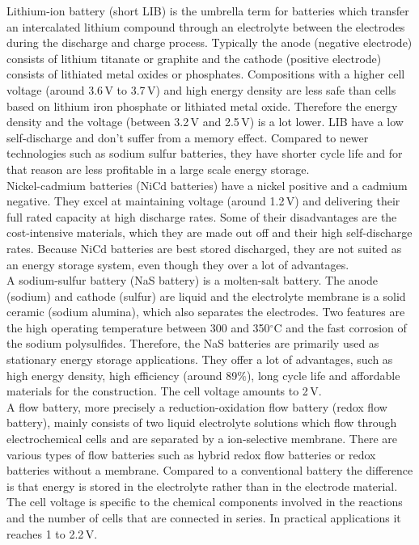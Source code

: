 \begin{parcolumns}[colwidths={1=2.5 cm, 2=10 cm, 3=2.5cm}]{3}
{Lithium-ion battery (short LIB) is the umbrella term for batteries which transfer an intercalated lithium compound through an electrolyte between the electrodes during the discharge and charge process. Typically the anode (negative electrode) consists of lithium titanate or graphite and the cathode (positive electrode) consists of lithiated metal oxides or phosphates. Compositions with a higher cell voltage (around 3.6\,V to 3.7\,V) and high energy density are less safe than cells based on lithium iron phosphate or lithiated metal oxide. Therefore the energy density and the voltage (between 3.2\,V and 2.5\,V) is a lot lower. LIB have a low self-discharge and don't suffer from a memory effect. Compared to newer technologies such as sodium sulfur batteries, they have shorter cycle life and for that reason are less profitable in a large scale energy storage.\\ Nickel-cadmium batteries (NiCd batteries) have a nickel positive and a cadmium negative. They excel at maintaining voltage (around 1.2\,V)  and delivering their full rated capacity at high discharge rates. Some of their disadvantages are the cost-intensive materials, which they are made out off and their high self-discharge rates. Because NiCd batteries are best stored discharged, they are not suited as an energy storage system, even though they over a lot of advantages.\\A sodium-sulfur battery (NaS battery) is a molten-salt battery. The anode (sodium) and cathode (sulfur) are liquid and the electrolyte membrane is a solid ceramic (sodium alumina), which also separates the electrodes. Two features are the high operating temperature between 300 and 350$^\circ$C  and the fast corrosion of the sodium polysulfides. Therefore, the NaS batteries are primarily used as stationary energy storage applications. They offer a lot of advantages, such as high energy density, high efficiency (around 89$\%$), long cycle life and affordable materials for the construction. The cell voltage amounts to 2\,V.
\\A flow battery, more precisely a reduction-oxidation flow battery (redox flow battery), mainly consists of two liquid electrolyte solutions which flow through electrochemical cells and are separated by a ion-selective membrane. There are various types of flow batteries such as hybrid redox flow batteries or redox batteries without a membrane. Compared to a conventional battery the difference is that energy is stored in the electrolyte rather than in the electrode material. The cell voltage is specific to the chemical components involved in the reactions and the number of cells that are connected in series. In practical applications it reaches 1 to 2.2\,V. 
}
\end{parcolumns}
